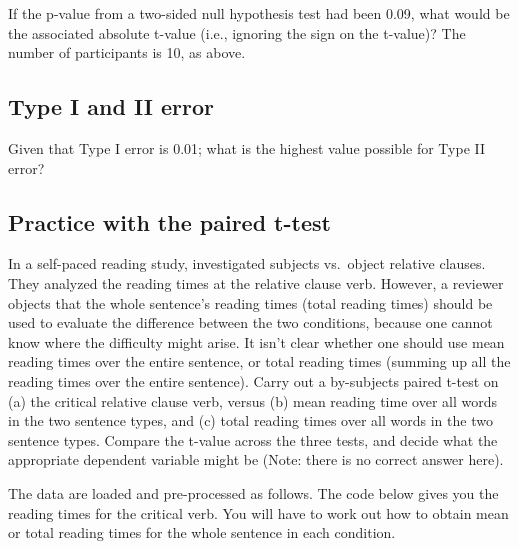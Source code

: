 \documentclass[12pt,]{krantz}
\begin{document}
If the p-value from a two-sided null hypothesis test had been 0.09, what would be the associated absolute t-value (i.e., ignoring the sign on the t-value)? The number of participants is 10, as above.

\hypertarget{sec:SamplingDistrnexercisesPart3}{%
\subsection{Type I and II error}\label{sec:SamplingDistrnexercisesPart3}}

Given that Type I error is 0.01; what is the highest value possible for Type II error?

\hypertarget{practice-with-the-paired-t-test}{%
\subsection{Practice with the paired t-test}\label{practice-with-the-paired-t-test}}

In a self-paced reading study, \citet{grodner} investigated subjects vs.~object relative clauses. They analyzed the reading times at the relative clause verb. However, a reviewer objects that the whole sentence's reading times (total reading times) should be used to evaluate the difference between the two conditions, because one cannot know where the difficulty might arise. It isn't clear whether one should use mean reading times over the entire sentence, or total reading times (summing up all the reading times over the entire sentence).
Carry out a by-subjects paired t-test on (a) the critical relative clause verb, versus (b) mean reading time over all words in the two sentence types, and (c) total reading times over all words in the two sentence types. Compare the t-value across the three tests, and decide what the appropriate dependent variable might be (Note: there is no correct answer here).

The data are loaded and pre-processed as follows. The code below gives you the reading times for the critical verb. You will have to work out how to obtain mean or total reading times for the whole sentence in each condition.
\end{document}
